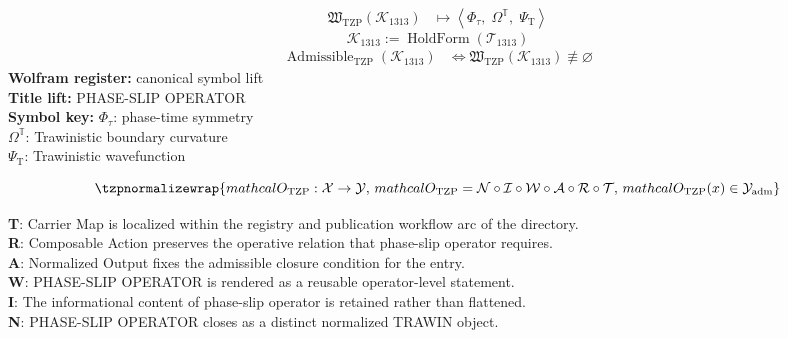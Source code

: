 \noindent
\begin{minipage}[t]{0.48\linewidth}
\begingroup
\small
\[
\begin{aligned}
\mathfrak{W}_{\mathrm{TZP}}\!\left(\mathcal{K}_{1313}\right)
&\longmapsto
\left\langle \Phi_{\tau},\; \Omega^{\mathbb{T}},\; \Psi_{\mathrm{T}} \right\rangle
\end{aligned}
\]
\[
\mathcal{K}_{1313}
:=
\operatorname{HoldForm}\!\left(\mathcal{T}_{1313}\right)
\]
\[
\begin{aligned}
\operatorname{Admissible}_{\mathrm{TZP}}\!\left(\mathcal{K}_{1313}\right)
&\Longleftrightarrow
\mathfrak{W}_{\mathrm{TZP}}\!\left(\mathcal{K}_{1313}\right)\not\equiv\varnothing
\end{aligned}
\]
\textbf{Wolfram register:} canonical symbol lift\\
\textbf{Title lift:} PHASE-SLIP OPERATOR\\
\textbf{Symbol key:} \(\Phi_{\tau}\): phase-time symmetry\\ \(\Omega^{\mathbb{T}}\): Trawinistic boundary curvature\\ \(\Psi_{\mathrm{T}}\): Trawinistic wavefunction
\par
\endgroup
\end{minipage}\hfill
\begin{minipage}[t]{0.48\linewidth}
\[
\tzpnormalizewrap{mathcal{O}_{\mathrm{TZP}} : \mathcal{X} \to \mathcal{Y},\,mathcal{O}_{\mathrm{TZP}} = \mathcal{N}\circ \mathcal{I}\circ \mathcal{W}\circ \mathcal{A}\circ \mathcal{R}\circ \mathcal{T},\,mathcal{O}_{\mathrm{TZP}}(x) \in \mathcal{Y}_{\mathrm{adm}}}
\]

\small
\textbf{T}: Carrier Map is localized within the registry and publication workflow arc of the directory.\\
\textbf{R}: Composable Action preserves the operative relation that phase-slip operator requires.\\
\textbf{A}: Normalized Output fixes the admissible closure condition for the entry.\\
\textbf{W}: PHASE-SLIP OPERATOR is rendered as a reusable operator-level statement.\\
\textbf{I}: The informational content of phase-slip operator is retained rather than flattened.\\
\textbf{N}: PHASE-SLIP OPERATOR closes as a distinct normalized TRAWIN object.
\normalsize
\end{minipage}

